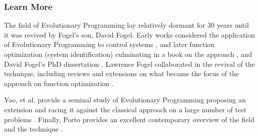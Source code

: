 % 
% 
\subsubsection{Learn More}
The field of Evolutionary Programming lay relatively dormant for 30 years until it was revived by Fogel's son, David Fogel. Early works considered the application of Evolutionary Programming to control systems \cite{Sebald1990}, and later function optimization (system identification) culminating in a book on the approach \cite{Fogel1991}, and David Fogel's PhD dissertation \cite{Fogel1992}.
Lawrence Fogel collaborated in the revival of the technique, including reviews \cite{Fogel1990, Fogel1994} and extensions on what became the focus of the approach on function optimization \cite{Fogel1991a}.

Yao, et al. provide a seminal study of Evolutionary Programming proposing an extension and racing it against the classical approach on a large number of test problems \cite{Yao1999}. Finally, Porto provides an excellent contemporary overview of the field and the technique \cite{Porto2000}.


